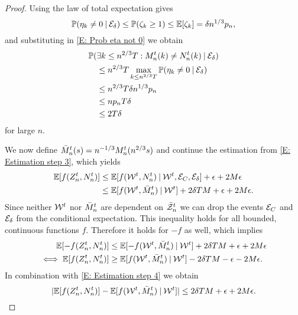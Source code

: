 \begin{proof}
Using the law of total expectation gives
\begin{equation}
\mathbb{P}( \eta_k \neq 0 \: | \: \mathcal{E}_{\delta} ) \leq \mathbb{P}( \zeta_k \geq 1 ) \leq \mathbb{E}[\zeta_k] = \delta n^{1 / 3}p_n,
\end{equation}
and substituting in \eqref{E: Prob eta not 0} we obtain
\begin{equation}
\begin{aligned}
&\mathbb{P}(\exists k\leq n^{2 / 3}T: M_n^t(k) \neq N_n^t(k) \: | \: \mathcal{E}_{\delta}) \\
&\quad \leq n^{2 / 3}T \max_{k \leq n^{2 / 3}T} \mathbb{P}( \eta_k \neq 0 \: | \: \mathcal{E}_{\delta} ) \\
&\quad \leq n^{2 / 3}T\delta n^{1 / 3}p_n \\
&\quad \leq n p_n T \delta \\
&\quad \leq 2T\delta 
\end{aligned}
\end{equation}
for large $n$.

We now define $\bar{M}_n^t(s) = n^{-1 / 3} M_n^t(n^{2 / 3}s)$ and continue the estimation from \eqref{E: Estimation step 3},
which yields
\begin{equation} \label{E: Estimation step 4}
\begin{aligned}
\mathbb{E}[f(Z_n^t, N_n^t)] 
&\leq \mathbb{E}[f(\mathcal{W}^t, N_n^t) \: | \: \mathcal{W}^t, \mathcal{E}_{C}, \mathcal{E}_{\delta}] + \epsilon + 2M\epsilon   \\
&\leq \mathbb{E}[f(\mathcal{W}^t, \bar{M}_n^t) \: | \: \mathcal{W}^t] + 2\delta T M + \epsilon  + 2M\epsilon  .
\end{aligned}
\end{equation}
Since neither $\mathcal{W}^t$ nor $\bar{M}_n^t$ are dependent on $\bar{\mathcal{Z}}^t_n$ we can drop the events $\mathcal{E}_{C}$ and $\mathcal{E}_{\delta}$ from the conditional expectation.
This inequality holds for all bounded, continuous functions $f$. 
Therefore it holds for $-f$ as well, which implies
\begin{equation}
\begin{aligned}
\mathbb{E}[-f(Z_n^t, N_n^t)] &\leq \mathbb{E}[-f(\mathcal{W}^t, \bar{M}_n^t) \: | \: \mathcal{W}^t]+ 2\delta T M  + \epsilon + 2M\epsilon \\
\iff  \mathbb{E}[f(Z_n^t, N_n^t)] &\geq \mathbb{E}[f(\mathcal{W}^t, \bar{M}_n^t) \: | \: \mathcal{W}^t] - 2\delta T M  - \epsilon - 2M\epsilon.
\end{aligned}
\end{equation}
In combination with \eqref{E: Estimation step 4} we obtain
\begin{equation} \label{E: Equality of Expectations}
	|\mathbb{E}[f(Z_n^t, N_n^t)] - \mathbb{E}[f(\mathcal{W}^t, \bar{M}_n^t) \: | \: \mathcal{W}^t] | \leq 2\delta T M + \epsilon  + 2M\epsilon.
\end{equation}


\end{proof}
